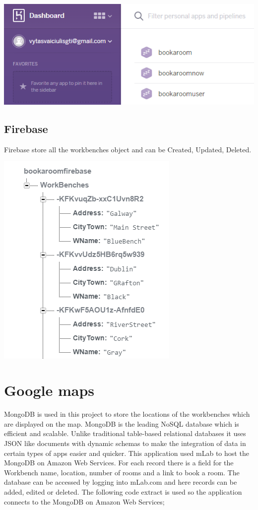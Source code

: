 \begin{itemize}
\begin{verbatim}
\end{verbatim}

\begin{center}    
	\includegraphics{img/Heroku.png}
\end{center}
\pagebreak
\subsection{Firebase}
Firebase store all the workbenches object and can be Created, Updated, Deleted.

\begin{center}    
	\includegraphics{img/Firebase.png}
\end{center}

\section{Google maps}

MongoDB is used in this project to store the locations of the workbenches which are displayed on the map. MongoDB is the leading NoSQL database which is efficient and scalable. Unlike traditional table-based relational databases it uses JSON like documents with dynamic schemas to make the integration of data in certain types of apps easier and quicker. This application used mLab to host the MongoDB on Amazon Web Services. For each record there is a field for the Workbench name, location, number of rooms and a link to book a room. The database can be accessed by logging into mLab.com and here records can be added, edited or deleted. The following code extract is used so the application connects to the MongoDB on Amazon Web Services;


\end{itemize}

